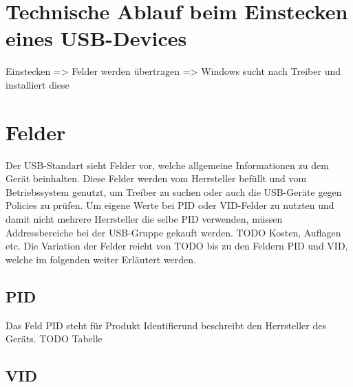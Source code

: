 			\section{Technische Ablauf beim Einstecken eines USB-Devices}
			Einstecken => Felder werden übertragen => Windows sucht nach Treiber und installiert diese
			\section{Felder}
			Der USB-Standart sieht Felder vor, welche allgemeine Informationen zu dem Gerät beinhalten. Diese Felder werden vom Herrsteller befüllt und vom Betriebssystem genutzt, um Treiber zu suchen oder auch die USB-Geräte gegen Policies zu prüfen. Um eigene Werte bei PID oder VID-Felder zu nutzten und damit nicht mehrere Herrsteller die selbe PID verwenden, müssen Addressbereiche bei der USB-Gruppe gekauft werden. TODO Kosten, Auflagen etc. Die Variation der Felder reicht von TODO bis zu den Feldern PID und VID, welche im folgenden weiter Erläutert werden.
			\subsection{PID}
			Das Feld PID steht für Produkt \glqq Identifier\grqq und beschreibt den Herrsteller des Geräts. TODO Tabelle
			\subsection{VID}